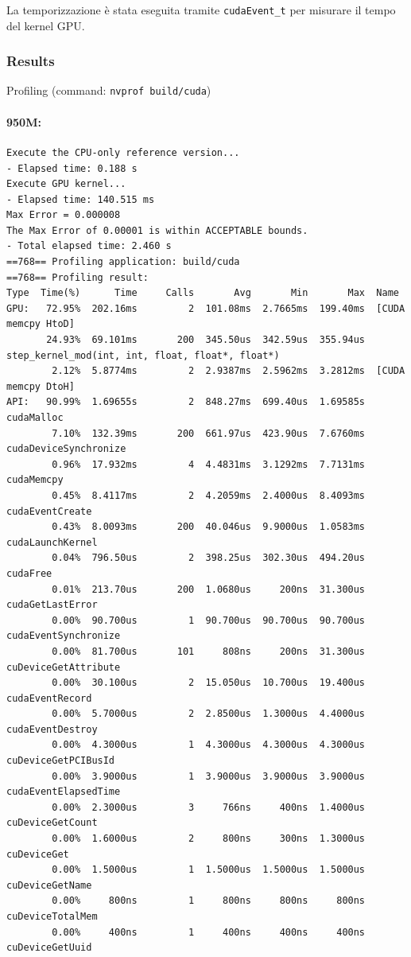 \noindent
La temporizzazione è stata eseguita tramite \texttt{cudaEvent\_t} per misurare il tempo del kernel GPU.

\subsubsection{Results}

Profiling (command: \texttt{nvprof build/cuda})

\paragraph{950M:}
{\scriptsize
\begin{verbatim}
Execute the CPU-only reference version...
- Elapsed time: 0.188 s
Execute GPU kernel...
- Elapsed time: 140.515 ms
Max Error = 0.000008
The Max Error of 0.00001 is within ACCEPTABLE bounds.
- Total elapsed time: 2.460 s
==768== Profiling application: build/cuda
==768== Profiling result:
Type  Time(%)      Time     Calls       Avg       Min       Max  Name
GPU:   72.95%  202.16ms         2  101.08ms  2.7665ms  199.40ms  [CUDA memcpy HtoD]
       24.93%  69.101ms       200  345.50us  342.59us  355.94us  step_kernel_mod(int, int, float, float*, float*)
        2.12%  5.8774ms         2  2.9387ms  2.5962ms  3.2812ms  [CUDA memcpy DtoH]
API:   90.99%  1.69655s         2  848.27ms  699.40us  1.69585s  cudaMalloc
        7.10%  132.39ms       200  661.97us  423.90us  7.6760ms  cudaDeviceSynchronize
        0.96%  17.932ms         4  4.4831ms  3.1292ms  7.7131ms  cudaMemcpy
        0.45%  8.4117ms         2  4.2059ms  2.4000us  8.4093ms  cudaEventCreate
        0.43%  8.0093ms       200  40.046us  9.9000us  1.0583ms  cudaLaunchKernel
        0.04%  796.50us         2  398.25us  302.30us  494.20us  cudaFree
        0.01%  213.70us       200  1.0680us     200ns  31.300us  cudaGetLastError
        0.00%  90.700us         1  90.700us  90.700us  90.700us  cudaEventSynchronize
        0.00%  81.700us       101     808ns     200ns  31.300us  cuDeviceGetAttribute
        0.00%  30.100us         2  15.050us  10.700us  19.400us  cudaEventRecord
        0.00%  5.7000us         2  2.8500us  1.3000us  4.4000us  cudaEventDestroy
        0.00%  4.3000us         1  4.3000us  4.3000us  4.3000us  cuDeviceGetPCIBusId
        0.00%  3.9000us         1  3.9000us  3.9000us  3.9000us  cudaEventElapsedTime
        0.00%  2.3000us         3     766ns     400ns  1.4000us  cuDeviceGetCount
        0.00%  1.6000us         2     800ns     300ns  1.3000us  cuDeviceGet
        0.00%  1.5000us         1  1.5000us  1.5000us  1.5000us  cuDeviceGetName
        0.00%     800ns         1     800ns     800ns     800ns  cuDeviceTotalMem
        0.00%     400ns         1     400ns     400ns     400ns  cuDeviceGetUuid
\end{verbatim}
}


